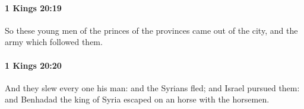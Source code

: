 		\paragraph{1 Kings 20:19} %
			\label{1KINGS-20-19}

			So these young men of the princes of the provinces came out of the city, and the army which followed them.


		\paragraph{1 Kings 20:20} %
			\label{1KINGS-20-20}

			And they slew every one his man: and the Syrians fled; and Israel pursued them: and Benhadad the king of Syria escaped on an horse with the horsemen.


